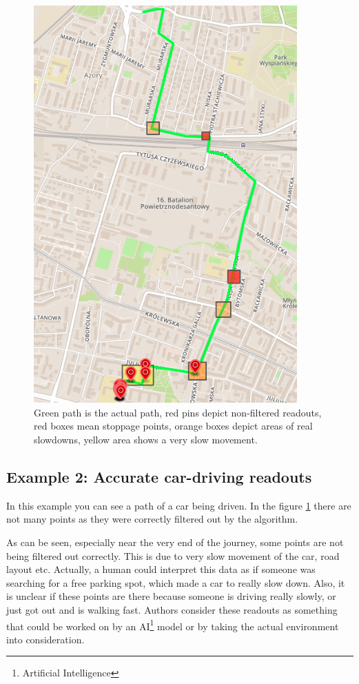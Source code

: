 \begin{figure}[]
    \includegraphics[width=0.9\textwidth]{images/2.png}
    \caption{Green path is the actual path, red pins depict non-filtered readouts, red boxes mean stoppage points, orange boxes depict areas of real slowdowns, yellow area shows a very slow movement.}
    \label{fig:screenexample2}
\end{figure}

\subsection{Example 2: Accurate car-driving readouts}

In this example you can see a path of a car being driven. In the figure \ref{fig:screenexample2} there are not many points as they were correctly filtered out by the algorithm.

As can be seen, especially near the very end of the journey, some points are not being filtered out correctly. This is due to very slow movement of the car, road layout etc. Actually, a human could interpret this data as if someone was searching for a free parking spot, which made a car to really slow down. Also, it is unclear if these points are there because someone is driving really slowly, or just got out and is walking fast. Authors consider these readouts as something that could be worked on by an AI\footnote{Artificial Intelligence} model or by taking the actual environment into consideration.

